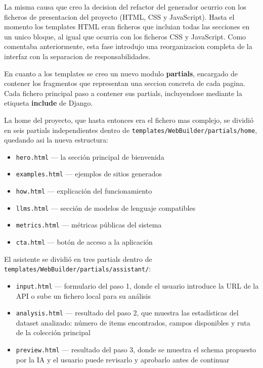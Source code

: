 La misma causa que creo la decision del refactor del generador ocurrio con los ficheros de presentacion del proyecto (HTML, CSS y JavaScript).
Hasta el momento los templates HTML eran ficheros que incluian todas las secciones en un unico bloque, al igual que ocurria con los ficheros CSS y JavaScript. Como comentaba anteriormente, esta fase introdujo una reorganizacion completa de la interfaz con la separacion de responsabilidades.

En cuanto a los templates se creo un nuevo modulo \textbf{partials}, encargado de contener los fragmentos que representan una seccion concreta de cada pagina. Cada fichero principal paso a contener sus partials, incluyendose mediante la etiqueta \textbf{include} de Django.

La home del proyecto, que hasta entonces era el fichero mas complejo, se dividió en seis partials independientes dentro de \texttt{templates/WebBuilder/partials/home}, quedando asi la nueva estructura:

\begin{itemize}
    \item \texttt{hero.html} — la sección principal de bienvenida
    \item \texttt{examples.html} — ejemplos de sitios generados
    \item \texttt{how.html} — explicación del funcionamiento
    \item \texttt{llms.html} — sección de modelos de lenguaje compatibles
    \item \texttt{metrics.html} — métricas públicas del sistema
    \item \texttt{cta.html} — botón de acceso a la aplicación
\end{itemize}

El asistente se dividió en tres partials dentro de \texttt{templates/WebBuilder/partials/assistant/}:

\begin{itemize}
    \item \texttt{input.html} — formulario del paso 1, donde el usuario 
    introduce la URL de la API o sube un fichero local para su análisis
    \item \texttt{analysis.html} — resultado del paso 2, que muestra las 
    estadísticas del dataset analizado: número de items encontrados, campos 
    disponibles y ruta de la colección principal
    \item \texttt{preview.html} — resultado del paso 3, donde se muestra 
    el schema propuesto por la IA y el usuario puede revisarlo y aprobarlo 
    antes de continuar
\end{itemize}

